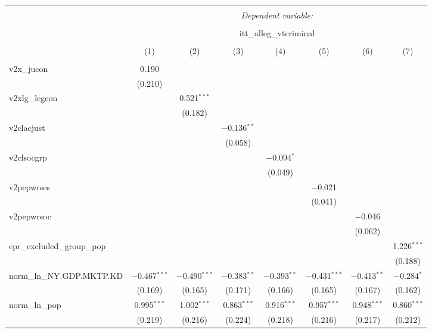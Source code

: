 
\begin{sidewaystable}[!htbp] \centering 
  \caption{} 
  \label{} 
\tiny 
\begin{tabular}{@{\extracolsep{5pt}}lccccccc} 
\\[-1.8ex]\hline 
\hline \\[-1.8ex] 
 & \multicolumn{7}{c}{\textit{Dependent variable:}} \\ 
\cline{2-8} 
\\[-1.8ex] & \multicolumn{7}{c}{itt\_alleg\_vtcriminal} \\ 
\\[-1.8ex] & (1) & (2) & (3) & (4) & (5) & (6) & (7)\\ 
\hline \\[-1.8ex] 
 v2x\_jucon & 0.190 &  &  &  &  &  &  \\ 
  & (0.210) &  &  &  &  &  &  \\ 
  v2xlg\_legcon &  & 0.521$^{***}$ &  &  &  &  &  \\ 
  &  & (0.182) &  &  &  &  &  \\ 
  v2clacjust &  &  & $-$0.136$^{**}$ &  &  &  &  \\ 
  &  &  & (0.058) &  &  &  &  \\ 
  v2clsocgrp &  &  &  & $-$0.094$^{*}$ &  &  &  \\ 
  &  &  &  & (0.049) &  &  &  \\ 
  v2pepwrses &  &  &  &  & $-$0.021 &  &  \\ 
  &  &  &  &  & (0.041) &  &  \\ 
  v2pepwrsoc &  &  &  &  &  & $-$0.046 &  \\ 
  &  &  &  &  &  & (0.062) &  \\ 
  epr\_excluded\_group\_pop &  &  &  &  &  &  & 1.226$^{***}$ \\ 
  &  &  &  &  &  &  & (0.188) \\ 
  norm\_ln\_NY.GDP.MKTP.KD & $-$0.467$^{***}$ & $-$0.490$^{***}$ & $-$0.383$^{**}$ & $-$0.393$^{**}$ & $-$0.431$^{***}$ & $-$0.413$^{**}$ & $-$0.284$^{*}$ \\ 
  & (0.169) & (0.165) & (0.171) & (0.166) & (0.165) & (0.167) & (0.162) \\ 
  norm\_ln\_pop & 0.995$^{***}$ & 1.002$^{***}$ & 0.863$^{***}$ & 0.916$^{***}$ & 0.957$^{***}$ & 0.948$^{***}$ & 0.860$^{***}$ \\ 
  & (0.219) & (0.216) & (0.224) & (0.218) & (0.216) & (0.217) & (0.212) \\ 

\end{tabular}
\end{sidewaystable}
